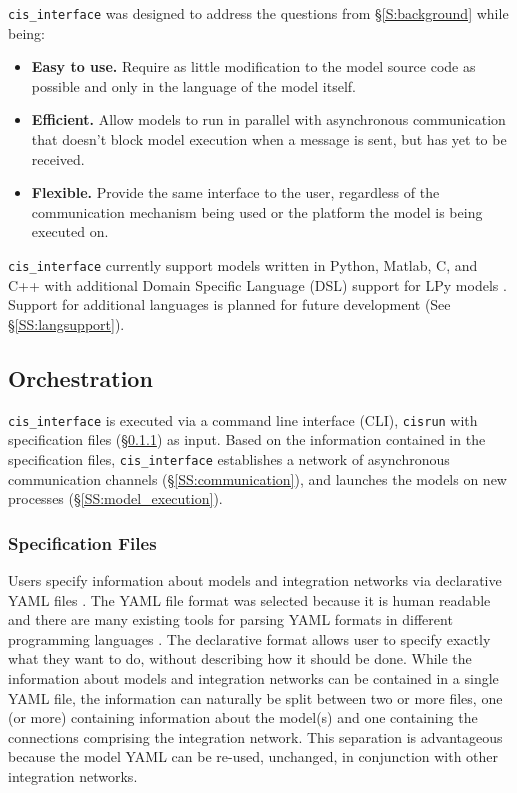 \documentclass[journal]{IEEEtran}
\newcommand{\cis}{{\tt cis\_interface}{}}
\begin{document}
{\cis} was designed to address the questions from \S\ref{S:background} while being:

\begin{itemize}
	\item {\bf Easy to use.} Require as little modification to the model source code as possible and only in the language of the model itself.
	\item {\bf Efficient.} Allow models to run in parallel with asynchronous communication that doesn't block model execution when a message is sent, but has yet to be received.
	\item {\bf Flexible.} Provide the same interface to the user, regardless of the communication mechanism being used or the platform the model is being executed on.
\end{itemize}

{\cis} currently support models written in Python, Matlab, C, and C++ with 
additional Domain Specific Language (DSL) support for LPy models \citep{Boudon2012}. Support for additional languages is planned for future development (See \S\ref{SS:langsupport}).

\subsection{Orchestration}\label{SS:orchestration}
%
{\cis} is executed via a command line interface (CLI), {\tt cisrun} with specification files (\S\ref{SSS:yaml}) as input. Based on the information contained in the specification files, {\cis} establishes a network of asynchronous communication channels (\S\ref{SS:communication}), and launches the models on new processes (\S\ref{SS:model_execution}).

\subsubsection{Specification Files}\label{SSS:yaml}
%
Users specify information about models and integration networks via declarative 
YAML files \citep{Ben-Kiki2009}. The YAML file format was selected because it is human readable 
and there are many existing tools for parsing YAML formats in different programming 
languages \citep[e.g.][]{Simonov2006,pyyaml,jsyaml}. The declarative format allows user to specify exactly what they 
want to do, without describing how it should be done. While the information 
about models and integration networks can be contained in a single YAML 
file, the information can naturally be split between two or more files, one (or more) containing 
information about the model(s) and one containing the connections comprising the 
integration network. This separation is advantageous because the model YAML 
can be re-used, unchanged, in conjunction with other integration networks. 
\end{document}
